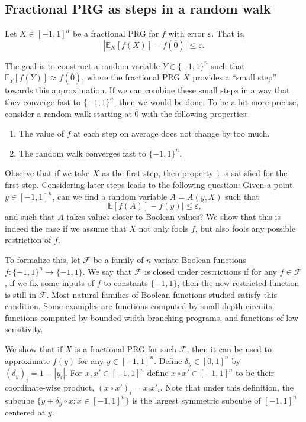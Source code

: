 \documentclass[11pt]{article}
\numberwithin{equation}{section}
\theoremstyle{definition}
\theoremstyle{plain}
\newcommand{\E}{\mathbb{E}}
\newcommand{\FF}{\mathcal{F}}
\newcommand{\eps}{\varepsilon}
\newcommand{\zero}{\overline{0}}
\begin{document}
\subsection{Fractional PRG as steps in a random walk}

Let $X \in [-1,1]^n$ be a fractional PRG for $f$ with error $\eps$. That is,
$$
|\E_X[f(X)] - f(\zero)| \le \eps.
$$


The goal is to construct a random variable $Y \in \{-1,1\}^n$ such that $\E_Y[f(Y)] \approx f(\zero)$, where the fractional PRG $X$ provides
a ``small step'' towards this approximation. If we can combine these small steps in a way that they converge fast to $\{-1,1\}^n$, then we would be done. To be a bit more precise, consider a random walk starting at $\zero$  with the following properties:
\begin{enumerate}
\item The value of $f$ at each step on average does not change by too much.
\item The random walk converges fast to $\{-1,1\}^n$.
\end{enumerate}

Observe that if we take $X$ as the first step, then property 1 is satisfied for the first step. Considering later steps leads to the following question: Given a point $y\in [-1,1]^n$, can we find a random variable $A=A(y,X)$ such that
$$
|\E[f(A)] - f(y)| \le \eps,
$$
and such that $A$ takes values closer to Boolean values?
We show that this is indeed the case if we assume that $X$ not only fools $f$, but also fools any possible restriction of $f$.

To formalize this, let $\FF$ be a family of $n$-variate Boolean functions $f:\{-1,1\}^n \to \{-1,1\}$. We say that $\FF$ is closed under restrictions if for any
$f \in \FF$, if we fix some inputs of $f$ to constants $\{-1,1\}$, then the new restricted function is still in $\FF$. Most natural families of Boolean functions studied
satisfy this condition. Some examples are functions computed by small-depth circuits, functions computed by bounded width branching programs, and functions
of low sensitivity.

We show that if $X$ is a fractional PRG for such $\FF$, then it can be used to approximate $f(y)$ for any $y \in [-1,1]^n$. Define $\delta_y \in [0,1]^n$ by
$(\delta_y)_i = 1 - |y_i|$. For $x,x' \in [-1,1]^n$ define $x \circ x' \in [-1,1]^n$ to be their coordinate-wise product, $(x \circ x')_i = x_i x'_i$.
Note that under this definition, the subcube $\{y + \delta_y \circ x: x \in [-1,1]^n\}$ is the largest symmetric subcube of $[-1,1]^n$ centered at $y$.
\end{document}
